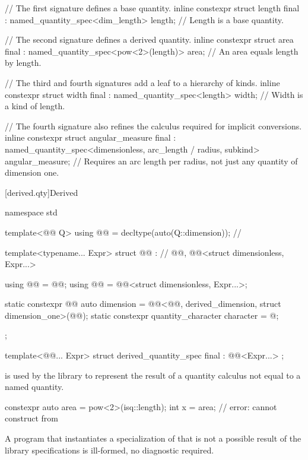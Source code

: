 \pnum
\begin{example}
\begin{codeblock}
// The first signature defines a base quantity.
inline constexpr struct length final : named_quantity_spec<dim_length> {
} length;  // Length is a base quantity.

// The second signature defines a derived quantity.
inline constexpr struct area final : named_quantity_spec<pow<2>(length)> {
} area;  // An area equals length by length.

// The third and fourth signatures add a leaf to a hierarchy of kinds.
inline constexpr struct width final : named_quantity_spec<length> {
} width;  // Width is a kind of length.

// The fourth signature also refines the calculus required for implicit conversions.
inline constexpr struct angular_measure final :
    named_quantity_spec<dimensionless, arc_length / radius, subkind> {
} angular_measure;  // Requires an arc length per radius, not just any quantity of dimension one.
\end{codeblock}
\end{example}

[derived.qty]{Derived}

\begin{codeblock}
namespace std {

template<@@ Q>
using @@ = decltype(auto(Q::dimension));  // \expos

template<typename... Expr>
struct @@ :                 // \expos
    @@,
    @@<struct dimensionless, Expr...> {
  using @@ = @@;
  using @@ = @@<struct dimensionless, Expr...>;

  static constexpr @@ auto dimension =
    @@<@@, derived_dimension, struct dimension_one>(@@{});
  static constexpr quantity_character character = @\seebelownc@;
};

template<@@... Expr>
struct derived_quantity_spec final : @@<Expr...> {};

}
\end{codeblock}

\pnum
{} is used by the library
to represent the result of a quantity calculus not equal to a named quantity.
\begin{example}
\begin{codeblock}
constexpr auto area = pow<2>(isq::length);
int x = area;  // error: cannot construct from 
\end{codeblock}
\end{example}
A program that instantiates a specialization of 
that is not a possible result of the library specifications
is ill-formed, no diagnostic required.

